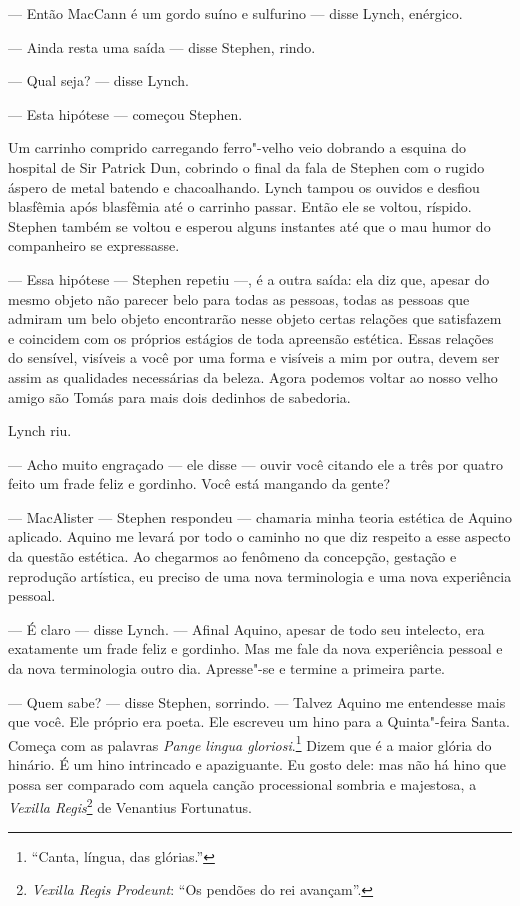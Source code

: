  --- Então MacCann é um gordo suíno e sulfurino --- disse Lynch, enérgico.

 --- Ainda resta uma saída --- disse Stephen, rindo.

 --- Qual seja? --- disse Lynch.

 --- Esta hipótese --- começou Stephen.

Um carrinho comprido carregando ferro"-velho veio dobrando a esquina do
hospital de Sir Patrick Dun, cobrindo o final da fala de Stephen com o
rugido áspero de metal batendo e chacoalhando. Lynch tampou os ouvidos
e desfiou blasfêmia após blasfêmia até o carrinho passar. Então ele se
voltou, ríspido. Stephen também se voltou e esperou alguns instantes
até que o mau humor do companheiro se expressasse.

 --- Essa hipótese --- Stephen repetiu ---, é a outra saída: ela diz que, apesar
do mesmo objeto não parecer belo para todas as pessoas, todas as
pessoas que admiram um belo objeto encontrarão nesse objeto certas
relações que satisfazem e coincidem com os próprios estágios de toda
apreensão estética. Essas relações do sensível, visíveis a você por uma
forma e visíveis a mim por outra, devem ser assim as qualidades
necessárias da beleza. Agora podemos voltar ao nosso velho amigo são 
Tomás para mais dois dedinhos de sabedoria.

Lynch riu.

 --- Acho muito engraçado --- ele disse --- ouvir você citando ele a três por
quatro feito um frade feliz e gordinho. Você está mangando da gente?

 --- MacAlister --- Stephen respondeu --- chamaria minha teoria estética de Aquino
aplicado. Aquino me levará por todo o caminho no que diz respeito a
esse aspecto da questão estética. Ao chegarmos ao fenômeno da
concepção, gestação e reprodução artística, eu preciso de uma nova
terminologia e uma nova experiência pessoal.

 --- É claro --- disse Lynch. --- Afinal Aquino, apesar de todo seu intelecto, era
exatamente um frade feliz e gordinho. Mas me fale da nova experiência
pessoal e da nova terminologia outro dia. Apresse"-se e termine a
primeira parte.

 --- Quem sabe? --- disse Stephen, sorrindo. --- Talvez Aquino me entendesse mais
que você. Ele próprio era poeta. Ele escreveu um hino para a
Quinta"-feira Santa. Começa com as palavras \textit{Pange lingua
gloriosi}.\footnote{ “Canta, língua, das glórias.”} Dizem que é a maior
glória do hinário. É um hino intrincado e apaziguante. Eu gosto dele:
mas não há hino que possa ser comparado com aquela canção processional
sombria e majestosa, a \textit{Vexilla Regis}\footnote{ \textit{Vexilla Regis Prodeunt}: 
``Os pendões do rei avançam''.} de Venantius Fortunatus.

